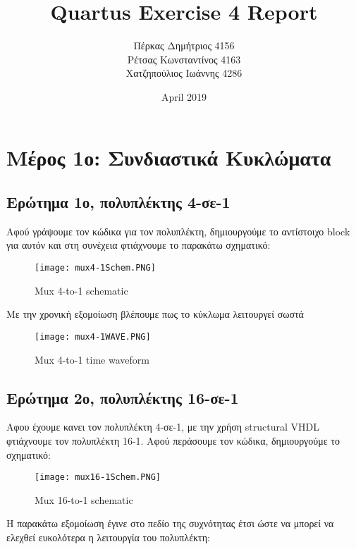 \documentclass{article}
\title{\foreignlanguage{english}{Quartus Exercise 4 Report}}
\author{Πέρκας Δημήτριος 4156\\Ρέτσας Κωνσταντίνος 4163\\Χατζηπούλιος Ιωάννης 4286}
\date{\foreignlanguage{english}{April 2019}}
\begin{document}
\maketitle
\thispagestyle{empty}

\clearpage
\thispagestyle{empty}
\tableofcontents
\listoffigures
\clearpage
{}

\section{Μέρος 1ο: Συνδιαστικά Κυκλώματα}

\subsection{Ερώτημα 1ο, πολυπλέκτης 4-σε-1}

Αφού γράψουμε τον κώδικα για τον πολυπλέκτη, δημιουργούμε το αντίστοιχο \foreignlanguage{english}{block} για αυτόν και στη συνέχεια φτιάχνουμε το παρακάτω σχηματικό:

\begin{figure}[h!]
  \caption{\foreignlanguage{english}{Mux 4-to-1 schematic}}
\texttt{[image: mux4-1Schem.PNG]} 
\end{figure}

Με την χρονική εξομοίωση βλέπουμε πως το κύκλωμα λειτουργεί σωστά
\begin{figure}[h!]
  \caption{\foreignlanguage{english}{Mux 4-to-1 time waveform}}
\texttt{[image: mux4-1WAVE.PNG]}
\end{figure}

\subsection{Ερώτημα 2ο, πολυπλέκτης 16-σε-1}

Αφου έχουμε κανει τον πολυπλέκτη 4-σε-1, με την χρήση \foreignlanguage{english}{structural VHDL} φτιάχνουμε τον πολυπλέκτη 16-1. Αφού περάσουμε τον κώδικα, δημιουργούμε το σχηματικό:

\begin{figure}[h!]
  \caption{\foreignlanguage{english}{Mux 16-to-1 schematic}}
\texttt{[image: mux16-1Schem.PNG]} 
\end{figure}

Η παρακάτω εξομοίωση έγινε στο πεδίο της συχνότητας έτσι ώστε να μπορεί να ελεχθεί ευκολότερα η λειτουργία του πολυπλέκτη:
\end{document}
